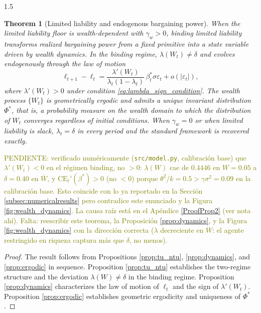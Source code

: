 \documentclass[12pt]{article}
\newtheorem{theorem}{Theorem}[section]
\theoremstyle{definition}
\theoremstyle{plain}
\begin{document}
\begin{spacing}{1.5}
\begin{theorem}[Limited liability and endogenous bargaining power] \label{thm:central}
When the limited liability floor is wealth-dependent with $\gamma_w > 0$, binding limited liability transforms realized bargaining power from a fixed primitive into a state variable driven by wealth dynamics. In the binding regime, $\lambda(W_t) \neq \delta$ and evolves endogenously through the law of motion
\[
\ell_{t+1} - \ell_t = \frac{\lambda'(W_t)}{\lambda_t(1-\lambda_t)}\,\beta_t^*\sigma\varepsilon_t + o(|\varepsilon_t|),
\]
where $\lambda'(W_t) > 0$ under condition \eqref{eq:lambda_sign_condition}. The wealth process $\{W_t\}$ is geometrically ergodic and admits a unique invariant distribution $\Phi^*$, that is, a probability measure on the wealth domain to which the distribution of $W_t$ converges regardless of initial conditions. When $\gamma_w = 0$ or when limited liability is slack, $\lambda_t = \delta$ in every period and the standard framework is recovered exactly.
\end{theorem}

\textcolor{olive}{PENDIENTE: verificado numéricamente (\texttt{src/model.py}, calibración base) que $\lambda'(W_t) < 0$ en el régimen binding, no $>0$: $\lambda(W)$ cae de $0.4446$ en $W=0.05$ a $\delta=0.40$ en $\overline W$, y $\mathrm{CE}_t'(\beta^*)>0$ (no $<0$) porque $\theta^2/k=0.5 > \gamma\sigma^2=0.09$ en la calibración base. Esto coincide con lo ya reportado en la Sección \ref{subsec:numericalresults} pero contradice este enunciado y la Figura \ref{fig:wealth_dynamics}. La causa raíz está en el Apéndice \ref{ProofProp2} (ver nota ahí). Falta: reescribir este teorema, la Proposición \ref{prop:dynamics}, y la Figura \ref{fig:wealth_dynamics} con la dirección correcta ($\lambda$ decreciente en $W$: el agente restringido en riqueza captura más que $\delta$, no menos).}

\begin{proof}
The result follows from Propositions \ref{prop:tu_ntu}, \ref{prop:dynamics}, and \ref{prop:ergodic} in sequence. Proposition \ref{prop:tu_ntu} establishes the two-regime structure and the deviation $\lambda(W) \neq \delta$ in the binding regime. Proposition \ref{prop:dynamics} characterizes the law of motion of $\ell_t$ and the sign of $\lambda'(W_t)$. Proposition \ref{prop:ergodic} establishes geometric ergodicity and uniqueness of $\Phi^*$.
\end{proof}


\end{spacing}
\end{document}
